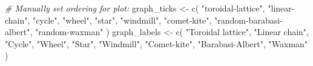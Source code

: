 \documentclass[
]{book}
\newenvironment{Shaded}{\begin{snugshade}}{\end{snugshade}}
\newcommand{\CommentTok}[1]{\textcolor[rgb]{0.56,0.35,0.01}{\textit{#1}}}
\newcommand{\FunctionTok}[1]{\textcolor[rgb]{0.00,0.00,0.00}{#1}}
\newcommand{\NormalTok}[1]{#1}
\newcommand{\OtherTok}[1]{\textcolor[rgb]{0.56,0.35,0.01}{#1}}
\newcommand{\StringTok}[1]{\textcolor[rgb]{0.31,0.60,0.02}{#1}}
\begin{document}
\begin{Shaded}
\begin{Highlighting}[]
\CommentTok{\# Manually set ordering for plot:}
\NormalTok{graph\_ticks }\OtherTok{\textless{}{-}} \FunctionTok{c}\NormalTok{(}
  \StringTok{"toroidal{-}lattice"}\NormalTok{,}
  \StringTok{"linear{-}chain"}\NormalTok{,}
  \StringTok{"cycle"}\NormalTok{,}
  \StringTok{"wheel"}\NormalTok{,}
  \StringTok{"star"}\NormalTok{,}
  \StringTok{"windmill"}\NormalTok{,}
  \StringTok{"comet{-}kite"}\NormalTok{,}
  \StringTok{"random{-}barabasi{-}albert"}\NormalTok{,}
  \StringTok{"random{-}waxman"}
\NormalTok{)}
\NormalTok{graph\_labels }\OtherTok{\textless{}{-}} \FunctionTok{c}\NormalTok{(}
  \StringTok{"Toroidal lattice"}\NormalTok{,}
  \StringTok{"Linear chain"}\NormalTok{,}
  \StringTok{"Cycle"}\NormalTok{,}
  \StringTok{"Wheel"}\NormalTok{,}
  \StringTok{"Star"}\NormalTok{,}
  \StringTok{"Windmill"}\NormalTok{,}
  \StringTok{"Comet{-}kite"}\NormalTok{,}
  \StringTok{"Barabasi{-}Albert"}\NormalTok{,}
  \StringTok{"Waxman"}
\NormalTok{)}


\end{Highlighting}
\end{Shaded}
\end{document}
